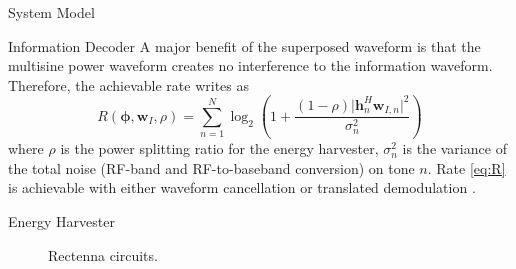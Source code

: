 \documentclass[journal]{IEEEtran}
\begin{document}
\begin{section}{System Model}
		\begin{subsection}{Information Decoder}
			A major benefit of the superposed waveform is that the multisine power waveform creates no interference to the information waveform. Therefore, the achievable rate writes as
			\begin{equation}\label{eq:R}
				R(\boldsymbol{\phi},\boldsymbol{w}_I,\rho) = \sum_{n=1}^N{\log_2\left(1+\frac{(1-\rho)\lvert \boldsymbol{h}_{n}^H\boldsymbol{w}_{I,n} \rvert^2}{\sigma_n^2}\right)}
			\end{equation}
			where $\rho$ is the power splitting ratio for the energy harvester, $\sigma_n^2$ is the variance of the total noise (RF-band and RF-to-baseband conversion) on tone $n$. Rate \ref{eq:R} is achievable with either waveform cancellation or translated demodulation \cite{Clerckx2018b}.
		\end{subsection}


		\begin{subsection}{Energy Harvester}
			\begin{figure}[!t]
				\centering
				\noindent
				\begin{minipage}[b]{0.5\linewidth}
					\centering
				\end{minipage}%
				\begin{minipage}[b]{0.5\linewidth}
					\centering
				\end{minipage}
				\caption{Rectenna circuits.}
			\end{figure}


\end{subsection}
\end{section}
\end{document}
